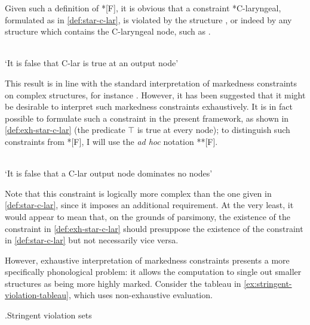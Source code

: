 Given such a definition of *[F], it is obvious that a constraint *C-laryngeal, formulated as in \cref{def:star-c-lar}, is violated by the structure , or indeed by any structure which contains the C-laryngeal node, such as .

\begin{constraint}\label{def:star-c-lar}
\\
`It is false that C-lar is true at an output node'
\end{constraint}

This result is in line with the standard interpretation of markedness constraints on complex structures, \cf for instance \citet{causley99:_compl_optim_theor}. However, it has been suggested \citep[\eg by][]{moren-foa} that it might be desirable to interpret such markedness constraints exhaustively. It is in fact possible to formulate such a constraint in the present framework, as shown in \cref{def:exh-star-c-lar} (the predicate $\top$ is true at every node); to distinguish such constraints from *[F], I will use the \emph{ad hoc} notation **[F].

\begin{constraint}
  \label{def:exh-star-c-lar}
\\
`It is false that a C-lar output node dominates no nodes'
\end{constraint}

Note that this constraint is logically more complex than the one given in \cref{def:star-c-lar}, since it imposes an additional requirement. At the very least, it would appear to mean that, on the grounds of parsimony, the existence of the constraint in \cref{def:exh-star-c-lar} should presuppose the existence of the constraint in \cref{def:star-c-lar} but not necessarily vice versa.

However, exhaustive interpretation of markedness constraints presents a more specifically phonological problem: it allows the computation to single out smaller structures as being more highly marked. Consider the tableau in \ref{ex:stringent-violation-tableau}, which uses non\hyp exhaustive evaluation.

\ex.\label{ex:stringent-violation-tableau}Stringent violation sets\\
\begin{OTtableau}{3}
\OTcandrow{\featurestring{\rt}}{*,,}
\end{OTtableau}

